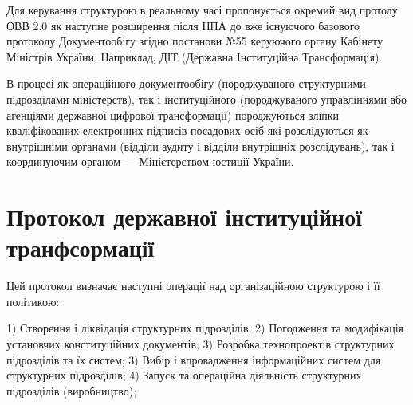 Для керування структурою в реальному часі пропонується окремий вид
протолу ОВВ 2.0 як наступне розширення після НПА до вже існуючого
базового протоколу Документообігу згідно постанови №55 керуючого
органу Кабінету Міністрів України. Наприклад, ДІТ (Державна
Інституційна Трансформація).

В процесі як операційного документообігу (породжуваного структурними
підрозділами міністерств), так і інституційного (породжуваного управліннями
або агенціями державної цифрової трансформації) породжуються зліпки кваліфікованих
електронних підписів посадових осіб які розслідуються як внутрішніми
органами (відділи аудиту і відділи внутрішніх розслідувань), так і
координуючим органом — Міністерством юстиції України.

\section{Протокол державної інституційної транфсормації}

Цей протокол визначає наступні операції над організаційною структурою і її політикою:

1) Створення і ліквідація структурних підрозділів;
2) Погодження та модифікація установчих конституційних документів;
3) Розробка технопроектів структурних підрозділів та їх систем;
3) Вибір і впровадження інформаційних систем для структурних підрозділів;
4) Запуск та операційна діяльність структурних підрозділів (виробництво);

